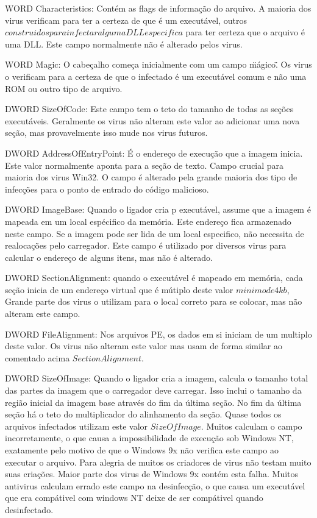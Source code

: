 WORD Characteristics: Contém as flags de informação do arquivo. A maioria dos virus
 verificam para ter a certeza de que é um executável, outros \(construidos para infectar
 alguma DLL especifica\) para ter certeza que o arquivo é uma DLL. Este campo normalmente
 não é alterado pelos virus.

WORD Magic: O cabeçalho começa inicialmente com um campo \"mágico\". Os virus o verificam
 para a certeza de que o infectado é um executável comum e não uma ROM ou outro tipo de arquivo.

DWORD SizeOfCode: Este campo tem o teto do tamanho de todas as seções executáveis.
 Geralmente os virus não alteram este valor ao adicionar uma nova seção, mas provavelmente
 isso mude nos virus futuros.

DWORD AddressOfEntryPoint:  É o endereço  de execução que a imagem inicia. Este valor
 normalmente aponta para a seção de texto. Campo crucial para maioria dos virus Win32.
 O campo é alterado pela grande maioria dos tipo de infecções para o ponto de entrado do código malicioso.
 
DWORD ImageBase: Quando o ligador cria p executável, assume que a imagem é mapeada em um local espécifico da memória.
 Este endereço fica armazenado neste campo. Se a imagem pode ser lida de um local especifico, não necessita de realocações pelo carregador.
 Este campo é utilizado por diversos virus para calcular o endereço de alguns itens, mas não é alterado.

DWORD SectionAlignment: quando o executável é mapeado em memória, cada seção inicia de um endereço virtual que é mútiplo deste valor \(minimo de 4 kb\),  Grande parte
 dos virus o utilizam para o local correto para se colocar, mas não alteram este campo.

DWORD FileAlignment: Nos arquivos PE, os dados em si iniciam de um multiplo deste valor. Os virus não alteram este valor mas usam de forma similar ao comentado acima \(SectionAlignment\).

DWORD SizeOfImage: Quando o ligador cria a imagem, calcula o tamanho total das partes da imagem que o carregador deve carregar.
 Isso inclui o tamanho da região inicial da imagem base através do fim da última seção. No fim da última seção há o teto do multiplicador do alinhamento da seção.
 Quase todos os arquivos infectados utilizam este valor \(SizeOfImage\). Muitos calculam o campo incorretamente, o que causa a impossibilidade de execução sob Windows NT,
 exatamente pelo motivo de que o Windows 9x não verifica este campo ao executar o arquivo. Para alegria de muitos os criadores de virus não testam muito suas criações. Maior parte
 dos virus de Windows 9x contém esta falha. Muitos antivirus calculam errado este campo na desinfecção, o que causa um executável que era compátivel com windows NT deixe de ser compátivel 
 quando desinfectado.

